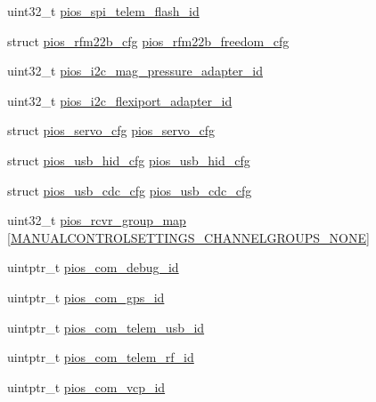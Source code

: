 \begin{DoxyCompactItemize}
\item 
uint32\-\_\-t \hyperlink{group___freedom_gabcea731eedc7b51eae0e4074e35fc8c1}{pios\-\_\-spi\-\_\-telem\-\_\-flash\-\_\-id}
\item 
struct \hyperlink{structpios__rfm22b__cfg}{pios\-\_\-rfm22b\-\_\-cfg} \hyperlink{group___freedom_ga90c3bcd6b750abf0c59333f52475d875}{pios\-\_\-rfm22b\-\_\-freedom\-\_\-cfg}
\item 
uint32\-\_\-t \hyperlink{group___freedom_ga0bc1cddc7bfac02e5a765f1ff09ad29f}{pios\-\_\-i2c\-\_\-mag\-\_\-pressure\-\_\-adapter\-\_\-id}
\item 
uint32\-\_\-t \hyperlink{group___freedom_ga20b68de0b754d943d653d816aad86148}{pios\-\_\-i2c\-\_\-flexiport\-\_\-adapter\-\_\-id}
\item 
struct \hyperlink{structpios__servo__cfg}{pios\-\_\-servo\-\_\-cfg} \hyperlink{group___freedom_ga57a87ef16d7949a9cc3589efc8d88a28}{pios\-\_\-servo\-\_\-cfg}
\item 
struct \hyperlink{structpios__usb__hid__cfg}{pios\-\_\-usb\-\_\-hid\-\_\-cfg} \hyperlink{group___freedom_ga3665f6d3a2cccc431b55b9432291e94c}{pios\-\_\-usb\-\_\-hid\-\_\-cfg}
\item 
struct \hyperlink{structpios__usb__cdc__cfg}{pios\-\_\-usb\-\_\-cdc\-\_\-cfg} \hyperlink{group___freedom_ga05cc3e449d417c7f9097d2659e6f5ca3}{pios\-\_\-usb\-\_\-cdc\-\_\-cfg}
\item 
uint32\-\_\-t \hyperlink{group___freedom_ga6c6cfc16eb738e47c123298e062297e2}{pios\-\_\-rcvr\-\_\-group\-\_\-map} \mbox{[}\hyperlink{group___manual_control_settings_gga94e1fe696fef2f85cbdb4a2e479c7ed2af9104b4e2c50328b0912db1e10fc3074}{\-M\-A\-N\-U\-A\-L\-C\-O\-N\-T\-R\-O\-L\-S\-E\-T\-T\-I\-N\-G\-S\-\_\-\-C\-H\-A\-N\-N\-E\-L\-G\-R\-O\-U\-P\-S\-\_\-\-N\-O\-N\-E}\mbox{]}
\item 
uintptr\-\_\-t \hyperlink{group___freedom_ga14dc9e3d330b80a37a9699c2112358e0}{pios\-\_\-com\-\_\-debug\-\_\-id}
\item 
uintptr\-\_\-t \hyperlink{group___freedom_ga05dca72c42c6c2b33fa62b8ee0fcb2ea}{pios\-\_\-com\-\_\-gps\-\_\-id}
\item 
uintptr\-\_\-t \hyperlink{group___freedom_ga513cc36d72b76de2fcb75ff233a79a4a}{pios\-\_\-com\-\_\-telem\-\_\-usb\-\_\-id}
\item 
uintptr\-\_\-t \hyperlink{group___freedom_gae48e848f715b08971e23528feee79339}{pios\-\_\-com\-\_\-telem\-\_\-rf\-\_\-id}
\item 
uintptr\-\_\-t \hyperlink{group___freedom_gaaeb3e0d65ed5c6e7b921c54e1ad905db}{pios\-\_\-com\-\_\-vcp\-\_\-id}

\end{DoxyCompactItemize}
